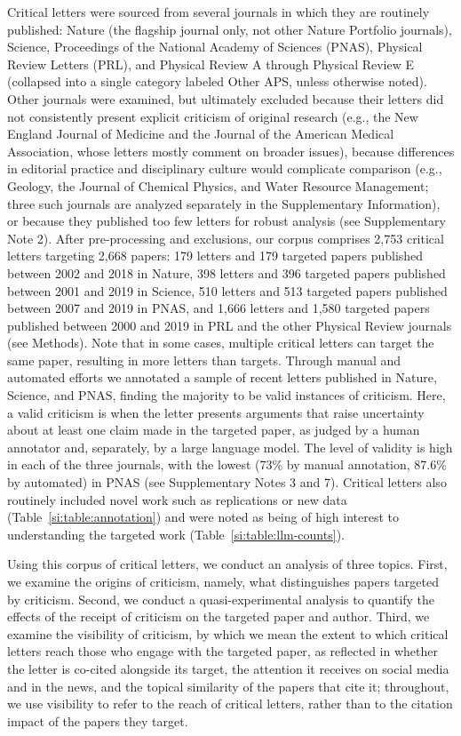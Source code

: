\documentclass[12pt,a4paper]{article}
\numberwithin{equation}{section}
\def\methods{Methods}
\def\appendix{Supplementary Information}
\begin{document}
Critical letters were sourced from several journals in which they are routinely published: Nature (the flagship journal only, not other Nature Portfolio journals), Science, Proceedings of the National Academy of Sciences (PNAS), Physical Review Letters (PRL), and Physical Review A through Physical Review E (collapsed into a single category labeled Other APS, unless otherwise noted).
Other journals were examined, but ultimately excluded because their letters did not consistently present explicit criticism of original research (e.g., the New England Journal of Medicine and the Journal of the American Medical Association, whose letters mostly comment on broader issues), because differences in editorial practice and disciplinary culture would complicate comparison (e.g., Geology, the Journal of Chemical Physics, and Water Resource Management; three such journals are analyzed separately in the \appendix), or because they published too few letters for robust analysis (see Supplementary Note 2).
After pre-processing and exclusions, our corpus comprises 2,753 critical letters targeting 2,668 papers: 179 letters and 179 targeted papers published between 2002 and 2018 in Nature, 398 letters and 396 targeted papers published between 2001 and 2019 in Science, 510 letters and 513 targeted papers published between 2007 and 2019 in PNAS, and 1,666 letters and 1,580 targeted papers published between 2000 and 2019 in PRL and the other Physical Review journals (see \methods).
Note that in some cases, multiple critical letters can target the same paper, resulting in more letters than targets. 
Through manual and automated efforts we annotated a sample of recent letters published in Nature, Science, and PNAS, finding the majority to be valid instances of criticism.
Here, a valid criticism is when the letter presents arguments that raise uncertainty about at least one claim made in the targeted paper, as judged by a human annotator and, separately, by a large language model.
The level of validity is high in each of the three journals, with the lowest (73\% by manual annotation, 87.6\% by automated) in PNAS (see Supplementary Notes 3 and 7).
Critical letters also routinely included novel work such as replications or new data (Table~\ref{si:table:annotation}) and were noted as being of high interest to understanding the targeted work (Table~\ref{si:table:llm-counts}).

Using this corpus of critical letters, we conduct an analysis of three topics.
First, we examine the origins of criticism, namely, what distinguishes papers targeted by criticism.
Second, we conduct a quasi-experimental analysis to quantify the effects of the receipt of criticism on the targeted paper and author.
Third, we examine the visibility of criticism, by which we mean the extent to which critical letters reach those who engage with the targeted paper, as reflected in whether the letter is co-cited alongside its target, the attention it receives on social media and in the news, and the topical similarity of the papers that cite it; throughout, we use visibility to refer to the reach of critical letters, rather than to the citation impact of the papers they target. 
\end{document}
